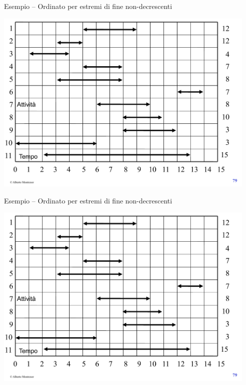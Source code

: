 \begin{frame}{Esempio -- Ordinato per estremi di fine non-decrescenti}

\vspace{-12pt}
\begin{center}
\includegraphics[width=0.95\textwidth,page=2]{intervalli-esempio.pdf}
\end{center}

\end{frame}

\begin{frame}{Esempio -- Ordinato per estremi di fine non-decrescenti}

\vspace{-12pt}
\begin{center}
\includegraphics[width=0.95\textwidth,page=3]{intervalli-esempio.pdf}
\end{center}

\end{frame}

